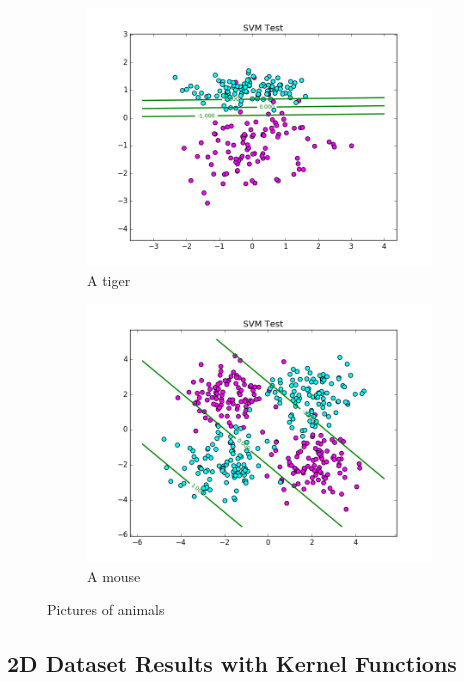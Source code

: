 \documentclass[10pt,twoside]{article}
\begin{document}
\begin{figure}
\begin{subfigure}[b]{0.25\textwidth}
                \centering
                \includegraphics[width=\linewidth]{Figures/P2/svm_data3_test_C1.png}
                \caption{A tiger}
                \label{fig:tiger}
        \end{subfigure}%
        \begin{subfigure}[b]{0.25\textwidth}
                \centering
                \includegraphics[width=\linewidth]{Figures/P2/svm_data4_test_C1.png}
                \caption{A mouse}
                \label{fig:mouse}
        \end{subfigure}
        \caption{Pictures of animals}\label{fig:animals}
\end{figure}


\subsection{2D Dataset Results with Kernel Functions}
\end{document}
